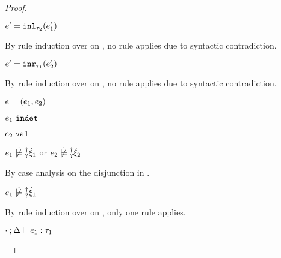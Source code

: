 \begin{proof}
\begin{byCases}
\begin{byCases}
\begin{byCases}
\begin{byCases}
\begin{byCases}
\begin{byCases}
\begin{pfsteps*}
              \item $e'=\mathtt{inl}_{\tau_2}({e_1'})$ 
              \end{pfsteps*}
              By rule induction over  on , no rule applies due to syntactic contradiction.
              \item[\text{(\ref{rule:VInr})}] 
              \begin{pfsteps*} 
              \item $e'=\mathtt{inr}_{\tau_1}({e_2'})$ 
              \end{pfsteps*}
              By rule induction over  on , no rule applies due to syntactic contradiction.
            \end{byCases}
          \end{byCases}
        \end{byCases}
        \item[\text{(\ref{rule:IPairL})}] 
        \begin{pfsteps*}
        \item $e=(e_1 , e_2)$ 
        \item $e_1 ~\mathtt{indet}$  
        \item $e_2 ~\mathtt{val}$  
        \item $\cnotsatisfyormay{e_1}{\hxi_1}$ or $\cnotsatisfyormay{e_2}{\hxi_2}$  
        \end{pfsteps*}
        By case analysis on the disjunction in .
        \begin{byCases}
          \item[\cnotsatisfyormay{e_1}{\hxi_1}]
          \begin{pfsteps*}
          \item $\cnotsatisfyormay{e_1}{\hxi_1}$  
          \end{pfsteps*}
          By rule induction over  on , only one rule applies.
          \begin{byCases}
            \item[\text{(\ref{rule:TPair})}]
            \begin{pfsteps*}
            \item $\cdot \mathbin{;} \Delta \vdash e_1 : \tau_1$  

\end{pfsteps*}
\end{byCases}
\end{byCases}
\end{byCases}
\end{byCases}
\end{byCases}
\end{proof}
